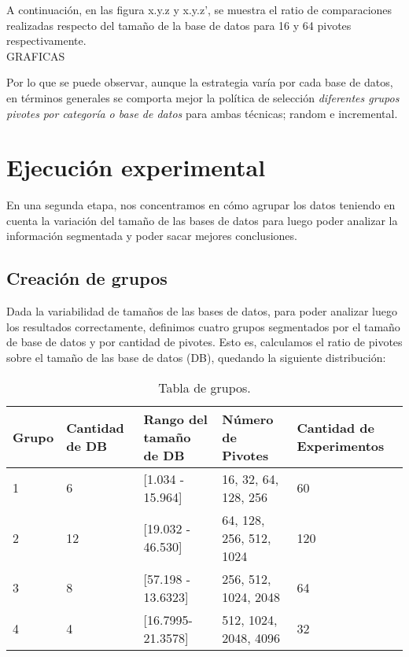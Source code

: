 A continuaci\'on, en las figura x.y.z y x.y.z’, se muestra el ratio de comparaciones realizadas respecto del tamaño de la base de datos para 16 y 64 pivotes respectivamente.\\

GRAFICAS

Por lo que se puede observar, aunque la estrategia var\'ia por cada base de datos, en t\'erminos generales se comporta mejor la pol\'itica de selecci\'on  \textit{diferentes grupos pivotes por categor\'ia o base de datos} para ambas t\'ecnicas; random e incremental.\\


\section{Ejecuci\'on experimental}

En una segunda etapa,  nos concentramos en c\'omo agrupar los datos teniendo en cuenta la variaci\'on del tama\~no de las bases de datos para luego poder analizar la informaci\'on segmentada y poder sacar mejores conclusiones.\\

\subsection{Creaci\'on de grupos}

Dada la variabilidad de tamaños de las bases de datos, para poder analizar luego los resultados correctamente, definimos cuatro grupos segmentados por el tamaño de base de datos y por cantidad de pivotes. Esto es, calculamos el ratio de pivotes sobre el tamaño de las base de datos (DB), quedando la siguiente distribuci\'on:\\

\begin{table}[htbp]
\begin{center}
\begin{tabular}{|p{1.1cm}|p{1.8cm}|p{3.2cm}|p{2.2cm}|p{2.5cm}|}
\hline
Grupo & 
Cantidad de DB & 
Rango del tama\~no de DB & 
N\'umero de Pivotes &  
Cantidad de Experimentos\\
\hline \hline
1 & 
6 & 
[1.034 - 15.964] & 
16, 32, 64, 128, 256 & 
60  \\ \hline
2 &
12 &
[19.032 - 46.530] &
64, 128, 256, 512, 1024 &
120  \\ \hline
3 &
8 &
[57.198 - 13.6323] &
256, 512, 1024, 2048 &
64  \\ \hline
4 &
4 &
[16.7995- 21.3578] &
512, 1024, 2048, 4096 &
32  \\ \hline
\end{tabular}
\caption{Tabla de grupos.}
\label{tabla:grupos}
\end{center}
\end{table}

